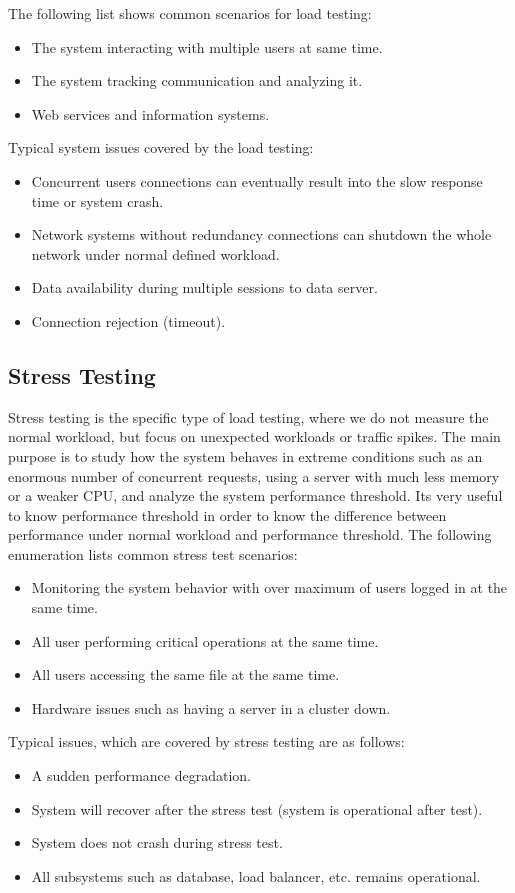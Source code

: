 The following list shows common scenarios for load testing:
\begin{itemize}
	\setlength\itemsep{0em}
	\item The system interacting with multiple users at same time.
	\item The system tracking communication and analyzing it.
	\item Web services and information systems.
\end{itemize}
Typical system issues covered by the load testing:
\begin{itemize}
	\setlength\itemsep{0em}
	\item Concurrent users connections can eventually result into the slow response time or system crash.
	\item Network systems without redundancy connections can shutdown the whole network under normal defined workload.
	\item Data availability during multiple sessions to data server.
	\item Connection rejection (timeout).
\end{itemize}

\subsection*{Stress Testing}
\label{Stress Testing}
Stress testing is the specific type of load testing, where we do not measure the normal workload, but focus on unexpected workloads or traffic spikes. The main purpose is to study how the system behaves in extreme conditions such as an enormous number of concurrent requests, using a server with much less memory or a weaker CPU, and analyze the system performance threshold. Its very useful to know performance threshold in order to know the difference between performance under normal workload and performance threshold. The following enumeration lists common stress test scenarios:
\begin{itemize}
	\setlength\itemsep{0em}
	\item Monitoring the system behavior with over maximum of users logged in at the same time.
	\item All user performing critical operations at the same time.
	\item All users accessing the same file at the same time.
	\item Hardware issues such as having a server in a cluster down.
\end{itemize}
Typical issues, which are covered by stress testing are as follows:
\begin{itemize}
	\setlength\itemsep{0em}
	\item A sudden performance degradation.
	\item System will recover after the stress test (system is operational after test).
	\item System does not crash during stress test.
	\item All subsystems such as database, load balancer, etc. remains operational.
\end{itemize}

